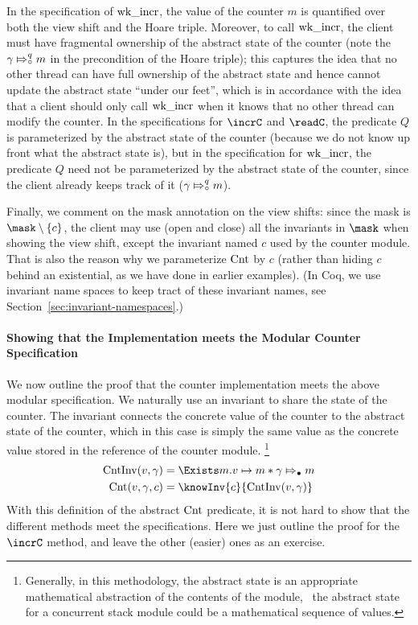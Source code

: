 In the specification of $\operatorname{wk{\_}incr}$, the value of the counter $m$ is quantified over both the view shift and the Hoare triple.
Moreover, to call $\operatorname{wk{\_}incr}$, the client must have fragmental ownership of the abstract state of the counter (note the $\gamma \Mapsto^{q}_{\circ} m$ in the precondition of the Hoare triple); this captures the idea that no other thread can have full ownership of the abstract state and hence cannot update the abstract state ``under our feet'', which is in accordance with the idea that a client should only call $\operatorname{wk{\_}incr}$ when it knows that no other thread can modify the counter.
In the specifications for $\incrC$ and $\readC$, the predicate $Q$ is parameterized by the abstract state of the counter (because we do not know up front what
the abstract state is), but in the specification for $\operatorname{wk{\_}incr}$, the predicate $Q$ need not be parameterized by the abstract state of the counter, since
the client already keeps track of it ($\gamma \Mapsto^{q}_{\circ} m$). 

Finally, we comment on the mask annotation on the view shifts: since the mask is $\mask\setminus{\{\CntInvName\}}$, the client may use (open and close) all the invariants in $\mask$ when showing the view shift, except the invariant named $c$ used by the counter module.
That is also the reason why we parameterize $\operatorname{Cnt}$ by $c$ (rather than hiding $c$ behind an existential, as we have done in earlier examples).
(In Coq, we use invariant name spaces to keep tract of these invariant names, see Section~\ref{sec:invariant-namespaces}.)

\paragraph{Showing that the Implementation meets the Modular Counter Specification}
We now outline the proof that the counter implementation meets the above modular specification.
We naturally use an invariant to share the state of the counter. The invariant connects the concrete value of the counter to the abstract state of the counter, which in this case is simply the same value as the concrete value stored in the reference of the counter module.
\footnote{Generally, in this methodology, the abstract state is an appropriate mathematical abstraction of the contents of the module, \eg\ the abstract state for a concurrent stack module could be a mathematical sequence of values.}
%
\begin{align*}
  \CntInv(v,\gamma) & = \Exists m. v\pointsto m \ast \abstractstateauth{\gamma}{m}\\
  \Cnt(v,\gamma,c) & = \knowInv{\CntInvName}{\CntInv(v,\gamma)}
\end{align*}
%
With this definition of the abstract $\operatorname{Cnt}$ predicate, it is not hard to show that the different methods
meet the specifications. Here we just outline the proof for the $\incrC$ method, and leave the other (easier) ones as
an exercise.

